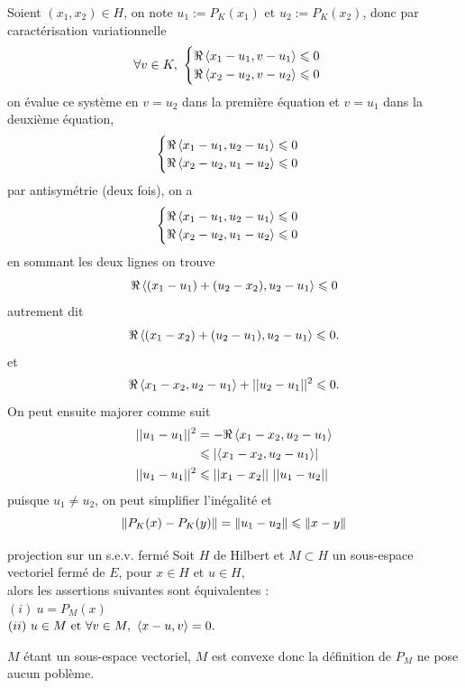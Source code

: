 \documentclass[a4paper,11pt, twoside]{article}
\begin{document}
\begin{Proof}
  Soient $(x_1,x_2)\in H$, on note $u_1:=P_K(x_1)$ et $u_2:=P_K(x_2)$, donc par caractérisation variationnelle
  $$\forall v\in K,\ \begin{cases}
    \Re\left\langle x_1-u_1,v-u_1 \right\rangle\leqslant 0\\
    \Re\left\langle x_2-u_2,v-u_2 \right\rangle\leqslant 0\\
  \end{cases}$$
  on évalue ce système en $v=u_2$ dans la première équation et $v=u_1$ dans la deuxième équation,
  $$\begin{cases}
    \Re\left\langle x_1-u_1,u_2-u_1 \right\rangle\leqslant 0\\
    \Re\left\langle x_2-u_2,u_1-u_2 \right\rangle\leqslant 0\\
  \end{cases}$$
  par antisymétrie (deux fois), on a
  $$\begin{cases}
    \Re\left\langle x_1-u_1,u_2-u_1 \right\rangle\leqslant 0\\
    \Re\left\langle x_2-u_2,u_1-u_2 \right\rangle\leqslant 0\\
  \end{cases}$$
  en sommant les deux lignes on trouve 
  $$\Re\left\langle (x_1-u_1)+(u_2-x_2),u_2-u_1 \right\rangle\leqslant 0$$
  autrement dit
  $$\Re\left\langle (x_1-x_2)+(u_2-u_1),u_2-u_1 \right\rangle\leqslant 0.$$
  et 
  $$\Re\left\langle x_1-x_2,u_2-u_1 \right\rangle+||u_2-u_1||^2\leqslant 0.$$
  On peut ensuite majorer comme suit
  \begin{align*}
    ||u_1-u_1||^2&=-\Re\left\langle x_1-x_2,u_2-u_1 \right\rangle\\
    &\leqslant \left| \left\langle x_1-x_2,u_2-u_1 \right\rangle\right|\\
    ||u_1-u_1||^2&\leqslant ||x_1-x_2||\ ||u_1-u_2||
  \end{align*}
  puisque $u_1\neq u_2$, on peut simplifier l'inégalité et 
  $$\left\lVert P_K(x)-P_K(y)\right\rVert=\left\lVert u_1-u_2\right\rVert\leqslant\left\lVert x-y\right\rVert$$
\end{Proof}



\begin{propC}{projection sur un s.e.v. fermé}
  Soit $H$ de Hilbert et $M\subset H$ un sous-espace vectoriel fermé de $E$, pour $x\in H$ et $u\in H$,\\

  alors les assertions suivantes sont équivalentes :\\
  $(i)\ u=P_M(x)$\\
  $(ii)\ u\in M\text{ et }\forall v\in M,\ \ps{x-u,v}=0.$
\end{propC}


\begin{RQ}
  $M$ étant un sous-espace vectoriel, $M$ est convexe donc la définition de $P_M$ ne pose aucun poblème.
\end{RQ}
\end{document}
